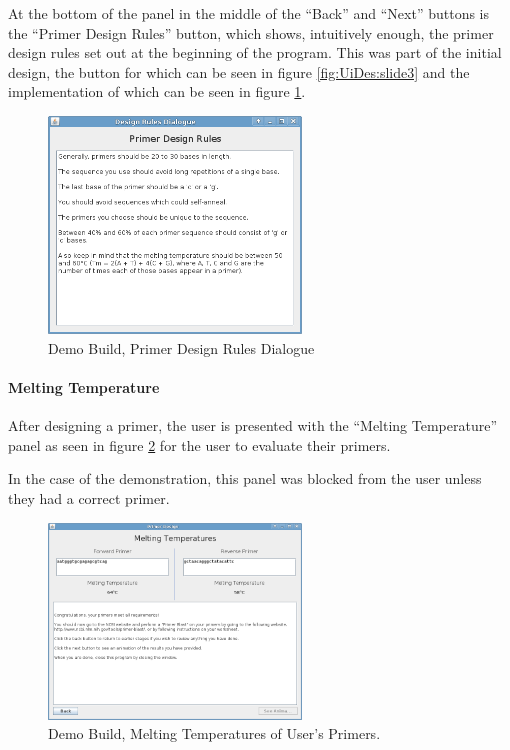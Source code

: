 At the bottom of the panel in the middle of the ``Back'' and ``Next''
buttons is the ``Primer Design Rules'' button, which shows,
intuitively enough, the primer design rules set out at the beginning
of the program.
This was part of the initial design, the button for which can be seen
in figure \ref{fig:UiDes:slide3} and the implementation of which can
be seen in figure \ref{fig:demoBuild:primerDesignRules}.

\begin{figure}[!t]
  \begin{center}
    \includegraphics[width=0.6\textwidth]{./images/demoBuild/primerDesignRules.png}
    \caption{
      \label{fig:demoBuild:primerDesignRules}
      Demo Build, Primer Design Rules Dialogue
    }
  \end{center}
\end{figure}

\paragraph{Melting Temperature}

After designing a primer, the user is presented with the ``Melting
Temperature'' panel as seen in figure \ref{fig:demoBuild:meltingTemp}
for the user to evaluate their primers.

In the case of the demonstration, this panel was blocked from the user
unless they had a correct primer.

\begin{figure}[!t]
  \begin{center}
    \includegraphics[width=0.6\textwidth]{./images/demoBuild/meltingTemp.png}
    \caption{
      \label{fig:demoBuild:meltingTemp}
      Demo Build, Melting Temperatures of User's Primers.
    }
  \end{center}
\end{figure}

